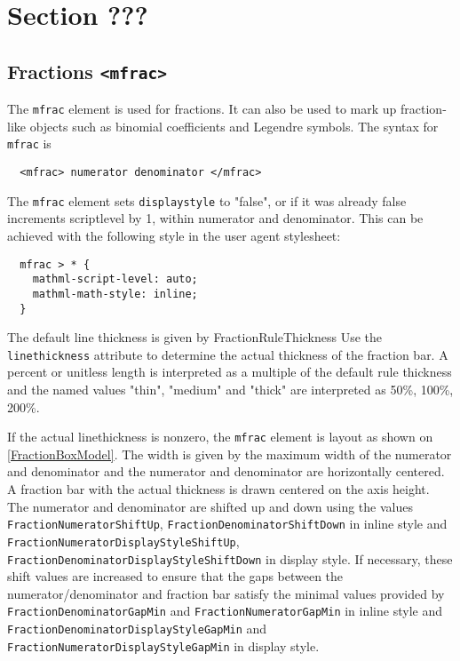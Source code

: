 \section{Section ???}

\subsection{Fractions {\tt <mfrac>}}

The {\tt mfrac} element is used for fractions. It can also be used to mark up
fraction-like objects such as binomial coefficients and Legendre symbols.
The syntax for {\tt mfrac} is

\begin{lstlisting}
  <mfrac> numerator denominator </mfrac>
\end{lstlisting}

The {\tt mfrac} element sets {\tt displaystyle} to "false", or if it was
already false increments scriptlevel by 1, within numerator and denominator.
This can be achieved with the following style in the user agent stylesheet:

\begin{lstlisting}
  mfrac > * {
    mathml-script-level: auto;
    mathml-math-style: inline;
  }
\end{lstlisting}

The default line thickness is given by FractionRuleThickness
Use the {\tt linethickness} attribute \cite{MathML3} to determine the
actual thickness of the fraction bar. A percent or unitless length is
interpreted as a multiple of the default rule thickness and
the named values "thin", "medium" and "thick" are interpreted as
50\%, 100\%, 200\%.

If the actual linethickness is nonzero, the {\tt mfrac} element is layout as
shown on \ref{FractionBoxModel}. The width is given by the maximum width of the
numerator and denominator and the numerator and denominator are horizontally
centered. A fraction bar with the actual thickness is drawn centered on the
axis height. The numerator and denominator are shifted
up and down using the values {\tt FractionNumeratorShiftUp},
{\tt FractionDenominatorShiftDown} in inline style and
{\tt FractionNumeratorDisplayStyleShiftUp},
{\tt FractionDenominatorDisplayStyleShiftDown} in display style.
If necessary, these shift values are increased to ensure that the gaps between
the numerator/denominator and fraction bar satisfy the minimal values provided
by {\tt FractionDenominatorGapMin} and
{\tt FractionNumeratorGapMin} in inline style and
{\tt FractionDenominatorDisplayStyleGapMin} and
{\tt FractionNumeratorDisplayStyleGapMin} in display style.

